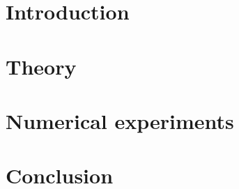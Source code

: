 \documentclass[11pt,a4paper,twoside,norsk]{article}
\begin{document}
\maketitle

\begin{abstract}
    
\end{abstract}

\section{Introduction}
\label{sec:introduction}

    
\section{Theory}
\label{sec:theory}


\section{Numerical experiments}
\label{sec:numexp}


\section{Conclusion}
\label{sec:conclusion}



 
\end{document}
